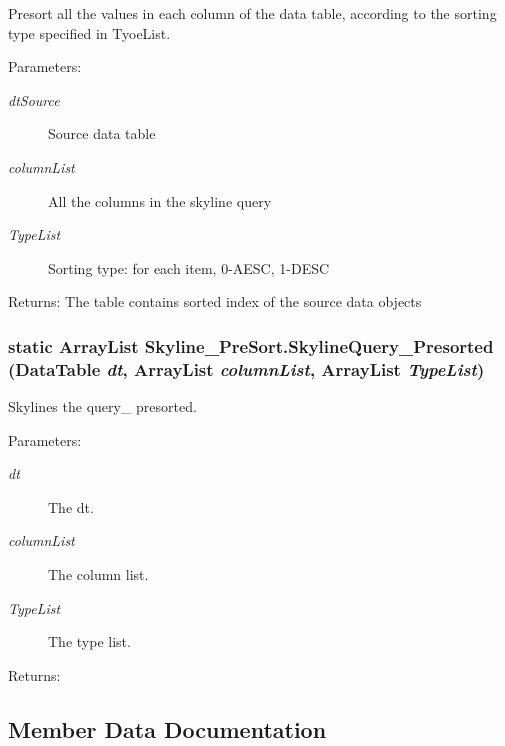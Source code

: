 Presort all the values in each column of the data table, according to the sorting type specified in Tyoe\-List. 

\begin{Desc}
\item[Parameters:]
\begin{description}
\item[{\em dt\-Source}]Source data table\item[{\em column\-List}]All the columns in the skyline query\item[{\em Type\-List}]Sorting type: for each item, 0-AESC, 1-DESC\end{description}
\end{Desc}
\begin{Desc}
\item[Returns:]The table contains sorted index of the source data objects\end{Desc}
\subsubsection{\setlength{\rightskip}{0pt plus 5cm}static Array\-List Skyline\_\-Pre\-Sort.Skyline\-Query\_\-Presorted (Data\-Table {\em dt}, Array\-List {\em column\-List}, Array\-List {\em Type\-List})\hspace{0.3cm}{\tt  [static]}}\label{class_skyline___pre_sort_4b14814443c1999d61a249d20ccac7ba}


Skylines the query\_\- presorted. 

\begin{Desc}
\item[Parameters:]
\begin{description}
\item[{\em dt}]The dt.\item[{\em column\-List}]The column list.\item[{\em Type\-List}]The type list.\end{description}
\end{Desc}
\begin{Desc}
\item[Returns:]\end{Desc}


\subsection{Member Data Documentation}
